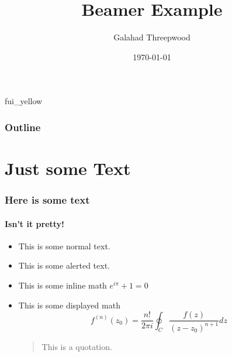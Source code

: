 \documentclass{beamer}
\title{Beamer Example}
\author{Galahad Threepwood}
\institute{Blandings Castle}
\date{\today}
\begin{document}
\begin{frame}[plain]
  \titlepage
\end{frame}

\begin{frame-colour}{fui_yellow}
  \frametitle{Outline}
  \tableofcontents
\end{frame-colour}

\section{Just some Text}
\begin{frame}
  \frametitle{Here is some text}
  \framesubtitle{Isn't it pretty!}
  \begin{itemize}[<+->]
  \item This is some normal text.\\
  \item This is some \alert{alerted text.}\\
  \item This is some inline math $e^{i\pi} + 1 =0$
  \item This is some displayed math
    \begin{equation}
      f^{(n)}(z_0) = \frac{n!}{2\pi i}\oint_C \frac{f(z)}{(z-z_0)^{n+1}} dz
    \end{equation}
    \begin{quotation}
      This is a quotation.
    \end{quotation}
  \end{itemize}
\end{frame}
\end{document}
